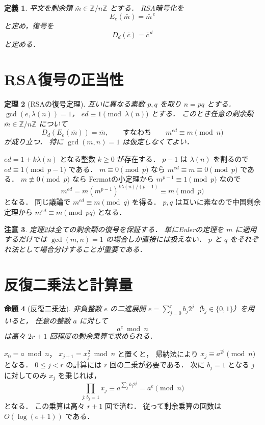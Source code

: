 \documentclass[a5paper,10pt,onecolumn]{jsarticle}
\makeatletter
\theoremstyle{mathnotetheorem}
\newtheorem{theorem}{定理}[section]
\newtheorem{definition}[theorem]{定義}
\newtheorem{proposition}[theorem]{命題}
\newtheorem{remark}[theorem]{注意}
\renewcommand{\proofname}{証明}
\renewenvironment{proof}[1][\proofname]{%
  \par\pushQED{\qed}\normalfont\topsep4\p@\@plus2\p@\relax
  \trivlist\item[\hskip\labelsep\bfseries #1]\ignorespaces
}{\popQED\endtrivlist\@endpefalse}
\makeatother
\begin{document}
\begin{definition}
平文を剰余類 $\bar m\in\mathbb Z/n\mathbb Z$ とする．
RSA暗号化を
\[
 E_e(\bar m)=\bar m^{\,e}
\]
と定め，復号を
\[
 D_d(\bar c)=\bar c^{\,d}
\]
と定める．
\end{definition}

\section{RSA復号の正当性}

\begin{theorem}[RSAの復号定理]\label{thm:rsa}
互いに異なる素数 $p,q$ を取り $n=pq$ とする．
$\gcd(e,\lambda(n))=1$，
$ed\equiv1\pmod{\lambda(n)}$ とする．
このとき任意の剰余類
$\bar m\in\mathbb Z/n\mathbb Z$ について
\[
 D_d(E_e(\bar m))=\bar m,
 \qquad\text{すなわち}\qquad
 m^{ed}\equiv m\pmod n
\]
が成り立つ．
特に $\gcd(m,n)=1$ は仮定しなくてよい．
\end{theorem}
\begin{proof}
$ed=1+k\lambda(n)$ となる整数 $k\ge0$ が存在する．
$p-1$ は $\lambda(n)$ を割るので
$ed\equiv1\pmod{p-1}$ である．
$m\equiv0\pmod p$ なら
$m^{ed}\equiv m\equiv0\pmod p$ である．
$m\not\equiv0\pmod p$ なら
Fermatの小定理から $m^{p-1}\equiv1\pmod p$ なので
\[
 m^{ed}=m(m^{p-1})^{k\lambda(n)/(p-1)}
 \equiv m\pmod p
\]
となる．
同じ議論で
$m^{ed}\equiv m\pmod q$ を得る．
$p,q$ は互いに素なので中国剰余定理から
$m^{ed}\equiv m\pmod{pq}$ となる．
\end{proof}

\begin{remark}
定理\ref{thm:rsa}は\emph{全ての}剰余類の復号を保証する．
単にEulerの定理を $m$ に適用するだけでは
$\gcd(m,n)=1$ の場合しか直接には扱えない．
$p$ と $q$ をそれぞれ法として場合分けすることが重要である．
\end{remark}

\section{反復二乗法と計算量}

\begin{proposition}[反復二乗法]\label{prop:squaring}
非負整数 $e$ の二進展開
$e=\sum_{j=0}^rb_j2^j$（$b_j\in\{0,1\}$）を用いると，
任意の整数 $a$ に対して
\[
 a^e\bmod n
\]
は高々 $2r+1$ 回程度の剰余乗算で求められる．
\end{proposition}
\begin{proof}
$x_0=a\bmod n$，
$x_{j+1}=x_j^2\bmod n$ と置くと，
帰納法により $x_j\equiv a^{2^j}\pmod n$ となる．
$0\le j<r$ の計算には $r$ 回の二乗が必要である．
次に $b_j=1$ となる $j$ に対してのみ $x_j$ を乗じれば，
\[
 \prod_{j:b_j=1}x_j
 \equiv a^{\sum_jb_j2^j}=a^e\pmod n
\]
となる．
この乗算は高々 $r+1$ 回で済む．
従って剰余乗算の回数は $O(\log(e+1))$ である．
\end{proof}
\end{document}
